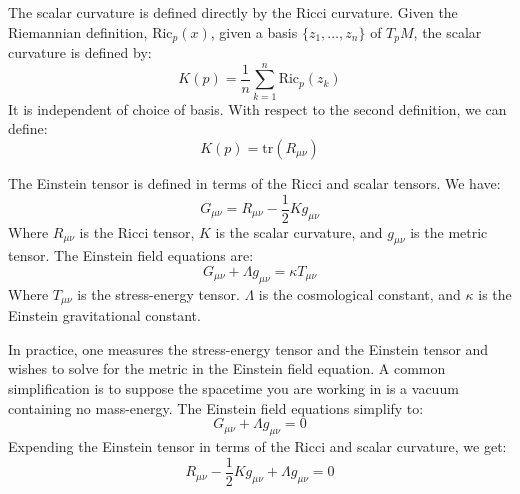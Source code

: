 \documentclass{beamer}
\begin{document}
    \begin{frame}
        The scalar curvature is defined directly by the Ricci curvature. Given
        the Riemannian definition, $\textrm{Ric}_{p}(x)$, given a basis
        $\{z_{1},\dots,z_{n}\}$ of $T_{p}M$, the scalar curvature is defined by:
        \begin{equation}
            K(p)=\frac{1}{n}\sum_{k=1}^{n}\textrm{Ric}_{p}(z_{k})
        \end{equation}
        It is independent of choice of basis. With respect to the second
        definition, we can define:
        \begin{equation}
            K(p)=\textrm{tr}(R_{\mu\nu})
        \end{equation}
    \end{frame}
    \begin{frame}
        The Einstein tensor is defined in terms of the Ricci and scalar tensors.
        We have:
        \begin{equation}
            G_{\mu\nu}=R_{\mu\nu}-\frac{1}{2}Kg_{\mu\nu}
        \end{equation}
        Where $R_{\mu\nu}$ is the Ricci tensor, $K$ is the scalar curvature,
        and $g_{\mu\nu}$ is the metric tensor. The Einstein field equations are:
        \begin{equation}
            G_{\mu\nu}+\Lambda{g}_{\mu\nu}=\kappa{T}_{\mu\nu}
        \end{equation}
        Where $T_{\mu\nu}$ is the stress-energy tensor. $\Lambda$ is the
        cosmological constant, and $\kappa$ is the Einstein gravitational
        constant.
    \end{frame}
    \begin{frame}
        In practice, one measures the stress-energy tensor and the Einstein
        tensor and wishes to solve for the metric in the Einstein field
        equation. A common simplification is to suppose the spacetime you are
        working in is a vacuum containing no mass-energy. The Einstein field
        equations simplify to:
        \begin{equation}
            G_{\mu\nu}+\Lambda{g}_{\mu\nu}=0
        \end{equation}
        Expending the Einstein tensor in terms of the Ricci and scalar
        curvature, we get:
        \begin{equation}
            R_{\mu\nu}-\frac{1}{2}Kg_{\mu\nu}+\Lambda{g}_{\mu\nu}=0
        \end{equation}
    \end{frame}
\end{document}
